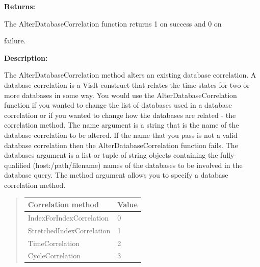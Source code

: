 \documentclass[letterpaper,10pt,english]{sphinxmanual}
\begin{document}
\begin{DUlineblock}{0em}
\item[] 
\item[] \textbf{Returns:}
\item[] The AlterDatabaseCorrelation function returns 1 on success and 0 on
\item[] failure.
\item[] 
\item[] \textbf{Description:}
\item[] The AlterDatabaseCorrelation method alters an existing database
correlation. A database correlation is a VisIt construct that relates the
time states for two or more databases in some way. You would use the
AlterDatabaseCorrelation function if you wanted to change the list of
databases used in a database correlation or if you wanted to change how the
databases are related - the correlation method. The name argument is a
string that is the name of the database correlation to be altered. If the
name that you pass is not a valid database correlation then the
AlterDatabaseCorrelation function fails. The databases argument is a list
or tuple of string objects containing the fully-qualified
(host:/path/filename) names of the databases to be involved in the database
query. The method argument allows you to specify a database correlation
method.
\item[] 
\end{DUlineblock}
\begin{quote}

\begin{tabulary}{\linewidth}{|L|L|}
\hline

\textbf{Correlation method}
 & 
Value
\\
\hline
IndexForIndexCorrelation
 & 
0
\\
\hline
StretchedIndexCorrelation
 & 
1
\\
\hline
TimeCorrelation
 & 
2
\\
\hline
CycleCorrelation
 & 
3
\\
\hline\end{tabulary}

\end{quote}

\begin{DUlineblock}{0em}
\item[] 
\end{DUlineblock}
\end{document}
